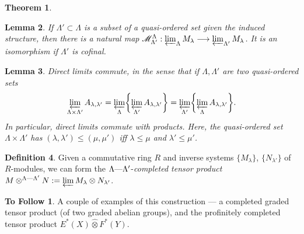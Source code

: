 \documentclass[11pt]{article}
\theoremstyle{plain}
\newtheorem{thm}{Theorem}[subsection]
\newtheorem{lem}[thm]{Lemma}
\theoremstyle{definition}
\newtheorem{defn}[thm]{Definition}
\newtheorem*{ToFollow}{To Follow}
\begin{document}
{\begin{thm}
\begin{itemise}
\end{itemise}
\end{thm}
\begin{lem}
If $\Lambda'\subset\Lambda$ is a subset of a quasi-ordered set given the induced 
structure, then there is a natural map
$\mathscr{M}_{\Lambda'}^\Lambda:\varprojlim_\Lambda M_\lambda\longrightarrow\varprojlim_{\Lambda'}
M_\lambda$. It is an isomorphism if $\Lambda'$ is cofinal.
\end{lem}
\begin{lem}
Direct limits commute, in the sense that if $\Lambda,\Lambda'$ are two
quasi-ordered sets\upcol
\[\varprojlim_{\Lambda\times\Lambda'}A_{\lambda,\lambda'}
=\varprojlim_{\Lambda}\biggl\{\varprojlim_{\Lambda'}A_{\lambda,\lambda'}\biggr\}
=\varprojlim_{\Lambda'}\biggl\{\varprojlim_{\Lambda}A_{\lambda,\lambda'}\biggr\}
.\]
In particular, direct limits commute with products. Here, the quasi-ordered set
$\Lambda\times\Lambda'$ has $(\lambda,\lambda')\leq(\mu,\mu')$ iff
$\lambda\leq\mu$ and $\lambda'\leq\mu'$.
\end{lem}
\begin{defn}
Given a commutative ring $R$ and inverse systems $\{M_\lambda\}$,
$\{N_{\lambda'}\}$ of $R$-modules, we can form the
$\Lambda\textup{---}\Lambda'$-\emph{completed tensor product}
$M\otimes^{\Lambda\textup{---}\Lambda'}N:=\varprojlim M_\lambda\otimes N_{\lambda'}$.
\end{defn}
\begin{ToFollow}
A couple of examples of this construction --- a completed graded tensor product
(of two graded abelian groups), and the profinitely completed tensor product
$E^*(X)\widehat\otimes F^*(Y)$.
\end{ToFollow}
}   %
\end{document}
